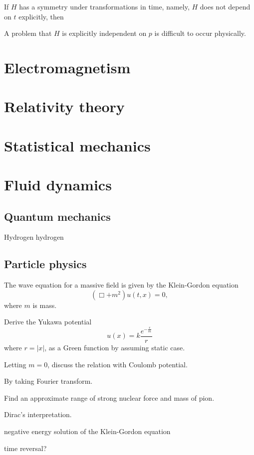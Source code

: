 \documentclass{../prb}
\begin{document}
If $H$ has a symmetry under transformations in time, namely, $H$ does not depend on $t$ explicitly, then 

A problem that $H$ is explicitly independent on $p$ is difficult to occur physically.

\chapter{Electromagnetism}

\chapter{Relativity theory}

\chapter{Statistical mechanics}

\chapter{Fluid dynamics}



\section{Quantum mechanics}
\begin{prb}
Hydrogen
\q hydrogen
\end{prb}


\section{Particle physics}
\begin{prb}
The wave equation for a massive field is given by the Klein-Gordon equation
\[(\Box+m^2)u(t,x)=0,\]
where $m$ is mass.
\begin{cond}
\item Derive the Yukawa potential\[u(x)=k\frac{e^{-\frac rm}}r\]where $r=|x|$, as a Green function by assuming static case.
\item Letting $m=0$, discuss the relation with Coulomb potential.
\item By taking Fourier transform.
\item Find an approximate range of strong nuclear force and mass of pion.
\end{cond}
\end{prb}

\begin{prb}
Dirac's interpretation.
\item negative energy solution of the Klein-Gordon equation
\item time reversal?
\end{prb}

\begin{prb}
\end{prb}

\begin{prb}
\end{prb}
\end{document}
